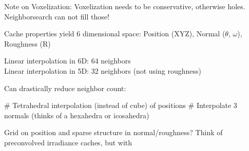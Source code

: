 \documentclass[thesis.tex]{subfiles}
\begin{document}
Note on Voxelization: Voxelization needs to be conservative, otherwise holes. Neighborsearch can not fill those!



Cache properties yield 6 dimensional space: Position (XYZ), Normal ($\theta$, $\omega$), Roughness (R)

Linear interpolation in 6D: 64 neighbors\\
Linear interpolation in 5D: 32 neighbors (not using roughness)

Can drastically reduce neighbor count:
\begin{easylist}
# Tetrahedral interpolation (instead of cube) of positions
# Interpolate 3 normals (thinks of a hexahedra or icosahedra)
\end{easylist}

Grid on position and sparse structure in normal/roughness? Think of preconvolved irradiance caches, but with 

%
\end{document}

